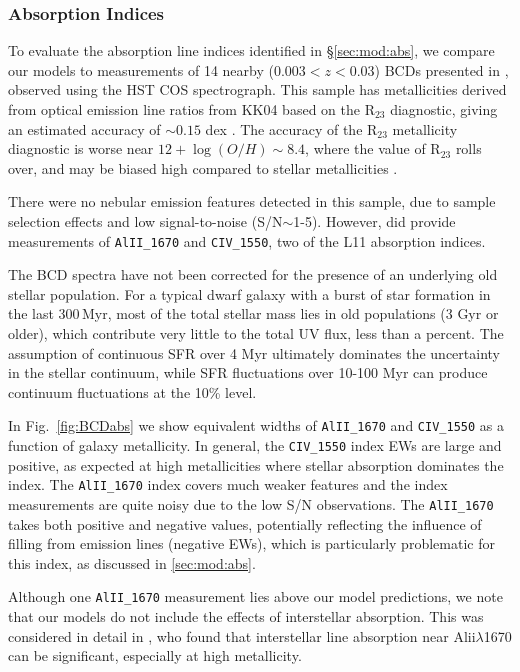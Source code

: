 \documentclass[preprint2,trackchanges]{aastex62}
\newcommand{\Myr}{$\,$Myr\xspace}
\begin{document}
\subsubsection{Absorption Indices} \label{sec:obs:abs}

To evaluate the absorption line indices identified in \S\ref{sec:mod:abs}, we compare our models to measurements of 14 nearby ($0.003 < z < 0.03$) BCDs presented in \citet{Zetterlund+2015}, observed using the HST COS spectrograph. This sample has metallicities derived from optical emission line ratios from KK04 based on the R$_{23}$ diagnostic, giving an estimated accuracy of ${\sim}0.15$ dex \citep{Zetterlund+2015}. The accuracy of the R$_{23}$ metallicity diagnostic is worse near $12+\log(O/H)\sim 8.4$, where the value of R$_{23}$ rolls over, and may be biased high compared to stellar metallicities \citep[e.g.,][]{Kudritzki+2012}.

There were no nebular emission features detected in this sample, due to sample selection effects and low signal-to-noise (S/N${\sim}$1-5). However, \citet{Zetterlund+2015} did provide measurements of \texttt{AlII\_1670} and \texttt{CIV\_1550}, two of the L11 absorption indices.

The \citet{Zetterlund+2015} BCD spectra have not been corrected for the presence of an underlying old stellar population. For a typical dwarf galaxy with a burst of star formation in the last 300\Myr, most of the total stellar mass lies in old populations (3 Gyr or older), which contribute very little to the total UV flux, less than a percent. The assumption of continuous SFR over 4 Myr ultimately dominates the uncertainty in the stellar continuum, while SFR fluctuations over 10-100 Myr can produce continuum fluctuations at the 10\% level.

In Fig.~\ref{fig:BCDabs} we show equivalent widths of \texttt{AlII\_1670} and \texttt{CIV\_1550} as a function of galaxy metallicity. In general, the \texttt{CIV\_1550} index EWs are large and positive, as expected at high metallicities where stellar absorption dominates the index. The \texttt{AlII\_1670} index covers much weaker features and the index measurements are quite noisy due to the low S/N observations. The \texttt{AlII\_1670} takes both positive and negative values, potentially reflecting the influence of filling from emission lines (negative EWs), which is particularly problematic for this index, as discussed in \ref{sec:mod:abs}.

Although one \texttt{AlII\_1670} measurement lies above our model predictions, we note that our models do not include the effects of interstellar absorption. This was considered in detail in \citet{Vidal-Garcia+2017}, who found that interstellar line absorption near Al{\sc ii}$\lambda$1670 can be significant, especially at high metallicity.
\end{document}
